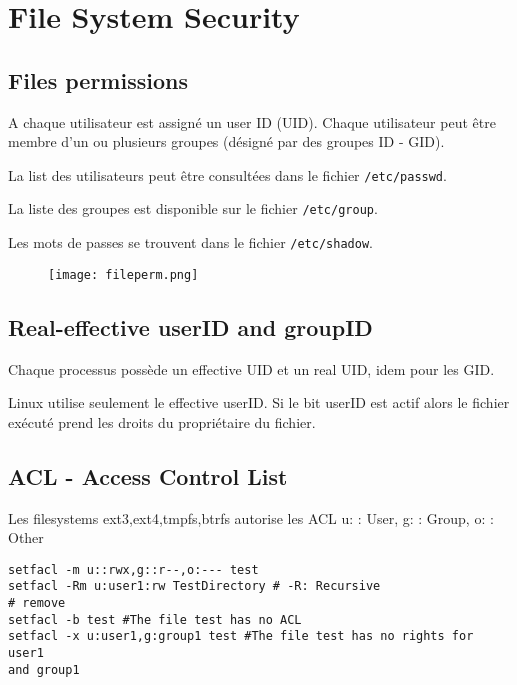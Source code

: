 \section{File System Security}
\subsection{Files permissions}
A chaque utilisateur est assigné un user ID (UID). Chaque utilisateur peut être membre d'un ou plusieurs groupes (désigné par des groupes ID - GID).

La list des utilisateurs peut être consultées dans le fichier \verb+/etc/passwd+.

La liste des groupes est disponible sur le fichier \verb+/etc/group+.

Les mots de passes se trouvent dans le fichier \verb+/etc/shadow+.
\begin{figure}[H]
    \centering
    \texttt{[image: fileperm.png]}
\end{figure}
\subsection{Real-effective userID and groupID}
Chaque processus possède un effective UID et un real UID, idem pour les GID.

Linux utilise seulement le effective userID. Si le bit userID est actif alors le fichier exécuté prend les droits du propriétaire du fichier.

\subsection{ACL - Access Control List}
Les filesystems ext3,ext4,tmpfs,btrfs autorise les ACL
u: : User, g: : Group, o: : Other
\begin{lstlisting}[style=bash]
setfacl -m u::rwx,g::r--,o:--- test
setfacl -Rm u:user1:rw TestDirectory # -R: Recursive
# remove
setfacl -b test #The file test has no ACL
setfacl -x u:user1,g:group1 test #The file test has no rights for user1
and group1
\end{lstlisting}


